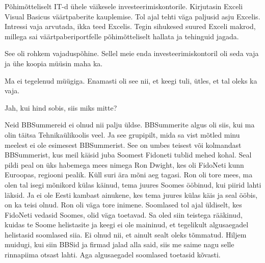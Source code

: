 
Põhimõtteliselt IT-d ühele väikesele investeerimiskontorile. Kirjutasin 
Exceli Visual Basicus väärtpaberite 
kauplemise. Tol ajal tehti väga paljusid asju Excelis. Intressi vaja arvutada, 
ikka teed Excelis. Tegin sihukesed suured Exceli makrod, millega sai 
väärtpaberiportfelle põhimõtteliselt hallata ja tehinguid jagada. 


See oli rohkem vajaduspõhine. Sellel meie enda investeerimiskontoril oli seda 
vaja ja ühe koopia müüsin maha ka. 


Ma ei  tegelenud müügiga. Enamasti oli see nii, et keegi tuli, ütles, et tal 
oleks ka vaja. 


Jah, kui hind sobis, siis miks mitte?


Neid BBSummereid ei olnud nii palju üldse. BBSummerite algus  oli siis, kui ma 
olin täitsa Tehnikaülikoolis veel. Ja see grupipilt, mida sa vist 
mõtled minu  
meelest ei ole esimesest BBSummerist. See on umbes teisest või kolmandast 
BBSummerist, kus meil käisid juba Soomest Fidoneti tublid mehed kohal. Seal 
pildi peal on üks habemega mees nimega Ron Dwight, kes 
oli FidoNeti kunn Euroopas, regiooni pealik. Küll suri ära mõni aeg tagasi. Ron 
oli tore mees, ma olen tal isegi mõnikord külas käinud, tema juures Soomes 
ööbinud, kui piirid lahti läksid. Ja ei ole Eesti kambast ainukene, kes tema 
juures külas käis ja seal ööbis, on ka teisi olnud. Ron oli väga tore inimene. 
Soomlased tol ajal üldiselt, kes FidoNeti vedasid Soomes, olid väga toetavad. 
Sa oled siin teistega rääkinud, kuidas te Soome helistasite ja keegi ei ole 
maininud, et tegelikult algusaegadel helistasid soomlased siia. Ei olnud nii, 
et ainult sealt oleks tõmmatud. Hiljem muidugi, kui siin BBSid ja firmad jalad 
alla said, siis me saime nagu selle rinnapiima otsast lahti. Aga algusaegadel 
soomlased toetasid kõvasti. 

